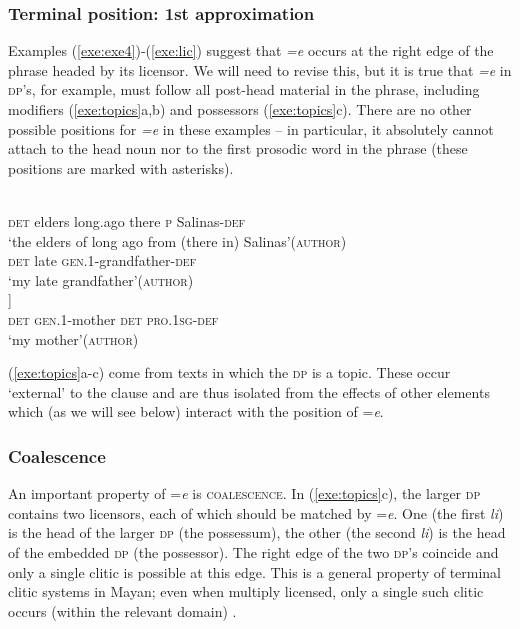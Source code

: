 \documentclass[output=paper,
modfonts
]{LSP/langsci}
\begin{document}
\subsubsection{Terminal position: 1st approximation}
Examples (\ref{exe:exe4})-(\ref{exe:lic})  suggest that \emph{=e} occurs at the right edge of the phrase headed by its licensor.
We will need to revise this, but it is true that  \emph{=e} in \textsc{dp}'s, for example, 
must follow all post-head material in the phrase, including modifiers (\ref{exe:topics}a,b) and possessors (\ref{exe:topics}c).  
There are no other possible positions for \emph{=e} in these examples  --  in particular, it absolutely cannot  
attach to the head noun nor to the first prosodic word in the phrase (these positions are marked with asterisks). 
\begin{exe}
\ex\label{exe:topics}
\begin{xlist}
\bridgeoverex
{}
\gll [\tikzmarkfullnamed{a}{ti} moletik * vo'ne tey ta Ats'am=\tikzmarkfullnamed{b}{e}] \\  
\textsc{det} elders {} long.ago there \textsc{p} Salinas-\textsc{def} \\
\glt `the elders of long ago from (there in) Salinas'(\textsc{author})
\bridgeoverex
{}
\gll [\tikzmarkfullnamed{c}{ti} anima * j-muk'tot=\tikzmarkfullnamed{d}{e}]  \\ 
\textsc{det} late {} \textsc{gen.1}-grandfather-\textsc{def} \\
\glt `my late grandfather'(\textsc{author}) \\
\bridgeoverex
{}
\gll [\tikzmarkfullnamed{e}{li} j-me' * [\tikzmarkfullnamed{f}{li} vo'on=\tikzmarkfullnamed{g}{e}]] \\ 
\textsc{det} \textsc{gen.1}-mother {}  \textsc{det} \textsc{pro.1sg-def} \\
\glt `my mother'(\textsc{author})
\end{xlist}
\end{exe}
(\ref{exe:topics}a-c) come from texts in which the \textsc{dp} is a topic. These occur `external' to the clause and are thus isolated from the effects of other elements which (as we
will see below) interact with the position of =\emph{e}.

 \subsubsection{Coalescence}
An important property of =\emph{e} is  \textsc{coalescence}.  In (\ref{exe:topics}c),
the larger \textsc{dp} contains two licensors, each of which should be matched by =\emph{e}. 
One (the first \emph{li}) is the head of the larger \textsc{dp} (the possessum), the other (the second \emph{li})  is the head of the embedded \textsc{dp} (the possessor). 
The right edge of the two \textsc{dp}'s coincide and only a single clitic is possible at this edge. This is a general property of
 terminal clitic systems in Mayan; even when multiply licensed, 
 only a single such clitic occurs (within the relevant domain) \citep{skopeteas2010}. 
\end{document}

